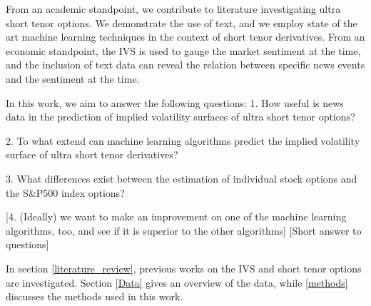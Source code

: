 






From an academic standpoint, we contribute to literature investigating ultra short tenor options. We demonstrate the use of text, and we employ state of the art machine learning techniques in the context of short tenor derivatives. From an economic standpoint, the IVS is used to gauge the market sentiment at the time, and the inclusion of text data can reveal the relation between specific news events and the sentiment at the time. 


In this work,  we aim to answer the following questions:
1. How useful is news data in the prediction of implied volatility surfaces of ultra short tenor options?

2. To what extend can machine learning algorithms predict the implied volatility surface of ultra short tenor derivatives?

3. What differences exist between the estimation of individual stock options and the S\&P500 index options?

[4. (Ideally) we want to make an improvement on one of the machine learning algorithms, too, and see if it is superior to the other algorithms]
[Short answer to questions]

In section \ref{literature_review}, previous works on the IVS and short tenor options are investigated. Section \ref{Data} gives an overview of the data, while \ref{methods} discusses the methods used in this work.  



